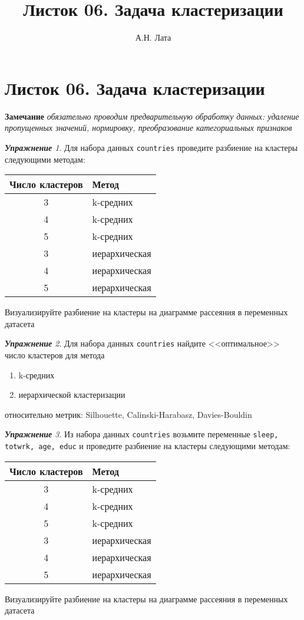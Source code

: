 \documentclass[a4,12pt]{article}
\title{Листок 06. Задача кластеризации}
\author{А.Н. Лата}
\theoremstyle{remark}
\newtheorem{exercise}{\textbf{Упражнение}}[section]
\begin{document}
\section*{\centering Листок 06. Задача кластеризации}


\textbf{Замечание} \textit{обязательно проводим предварительную обработку данных:
удаление пропущенных значений, нормировку, преобразование категориальных признаков}

\begin{exercise}
Для набора данных \texttt{countries} проведите разбиение на кластеры следующими
методам:
\begin{center}
	\begin{tabular}{c|l}
		Число кластеров & Метод \\ \hline
		3 & k-средних \\
		4 & k-средних \\
		5 & k-средних \\
		3 & иерархическая \\
		4 & иерархическая \\
		5 & иерархическая \\ \hline
	\end{tabular}
\end{center}
Визуализируйте разбиение на кластеры на диаграмме рассеяния в переменных датасета
\end{exercise}

\begin{exercise}
Для набора данных \texttt{countries} найдите <<оптимальное>> число кластеров
для метода
\begin{enumerate}
	\item k-средних
	\item иерархической кластеризации
\end{enumerate}
относительно метрик: Silhouette, Calinski-Harabasz, Davies-Bouldin
\end{exercise}

\begin{exercise}
Из набора данных \texttt{countries} возьмите переменные 
\texttt{sleep, totwrk, age, educ} и проведите разбиение на кластеры следующими
методам:
\begin{center}
	\begin{tabular}{c|l}
		Число кластеров & Метод \\ \hline
		3 & k-средних \\
		4 & k-средних \\
		5 & k-средних \\
		3 & иерархическая \\
		4 & иерархическая \\
		5 & иерархическая \\ \hline
	\end{tabular}
\end{center}
Визуализируйте разбиение на кластеры на диаграмме рассеяния в переменных датасета
\end{exercise}
\end{document}
